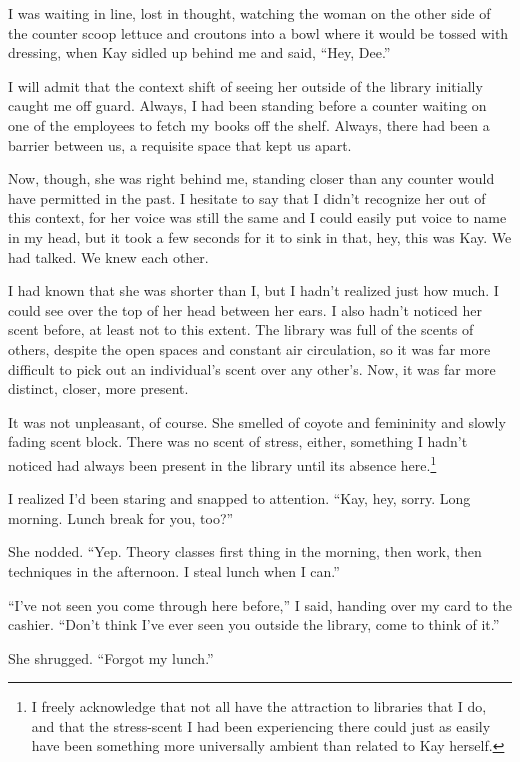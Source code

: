 I was waiting in line, lost in thought, watching the woman on the other side of the counter scoop lettuce and croutons into a bowl where it would be tossed with dressing, when Kay sidled up behind me and said, ``Hey, Dee.''

I will admit that the context shift of seeing her outside of the library initially caught me off guard. Always, I had been standing before a counter waiting on one of the employees to fetch my books off the shelf. Always, there had been a barrier between us, a requisite space that kept us apart.

Now, though, she was right behind me, standing closer than any counter would have permitted in the past. I hesitate to say that I didn't recognize her out of this context, for her voice was still the same and I could easily put voice to name in my head, but it took a few seconds for it to sink in that, hey, this was Kay. We had talked. We knew each other.

I had known that she was shorter than I, but I hadn't realized just how much. I could see over the top of her head between her ears. I also hadn't noticed her scent before, at least not to this extent. The library was full of the scents of others, despite the open spaces and constant air circulation, so it was far more difficult to pick out an individual's scent over any other's. Now, it was far more distinct, closer, more present.

It was not unpleasant, of course. She smelled of coyote and femininity and slowly fading scent block. There was no scent of stress, either, something I hadn't noticed had always been present in the library until its absence here.\footnote{I freely acknowledge that not all have the attraction to libraries that I do, and that the stress-scent I had been experiencing there could just as easily have been something more universally ambient than related to Kay herself.}

I realized I'd been staring and snapped to attention. ``Kay, hey, sorry. Long morning. Lunch break for you, too?''

She nodded. ``Yep. Theory classes first thing in the morning, then work, then techniques in the afternoon. I steal lunch when I can.''

``I've not seen you come through here before,'' I said, handing over my card to the cashier. ``Don't think I've ever seen you outside the library, come to think of it.''

She shrugged. ``Forgot my lunch.''

